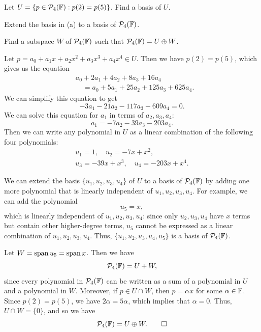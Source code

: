 \begin{exc}
\begin{exercise}\leavevmode
\begin{parts}
\item Let $U=\{p\in\mathcal{P}_4(\mathbb{F}) : p(2)=p(5)\}$. Find a basis of $U$.
\item Extend the basis in (a) to a basis of $\mathcal{P}_4(\mathbb{F})$.
\item Find a subspace $W$ of $\mathcal{P}_4(\mathbb{F})$ such that $\mathcal{P}_4(\mathbb{F})=U\oplus W$.
\end{parts}
\end{exercise}
\begin{solution}
\begin{parts}
\item Let $p=a_0+a_1x+a_2x^2+a_3x^3+a_4x^4\in U$. Then we have $p(2)=p(5)$,
  which gives us the equation
  \begin{align*}
  &a_0+2a_1+4a_2+8a_3+16a_4\\
  &\quad= a_0+5a_1+25a_2+125a_3+625a_4.
  \end{align*}
  We can simplify this equation to get
  \[ -3a_1-21a_2-117a_3-609a_4 = 0. \]
  We can solve this equation for $a_1$ in terms of $a_2,a_3,a_4$:
  \[ a_1 = -7a_2-39a_3-203a_4. \]
  Then we can write any polynomial in $U$ as a linear combination of the
  following four polynomials:
  \begin{gather*}
  u_1=1, \quad u_2=-7x+x^2,\\
  u_3=-39x+x^3, \quad u_4=-203x+x^4.
  \end{gather*}
\item We can extend the basis $\{u_1,u_2,u_3,u_4\}$ of $U$ to a basis of
  $\mathcal{P}_4(\mathbb{F})$ by adding one more polynomial that is linearly independent of
  $u_1,u_2,u_3,u_4$. For example, we can add the polynomial
  \[ u_5 = x, \]
  which is linearly independent of $u_1,u_2,u_3,u_4$: since only
  $u_2,u_3,u_4$ have $x$ terms but contain other higher-degree terms, $u_5$
  cannot be expressed as a linear combination of $u_1,u_2,u_3,u_4$. Thus,
  $\{u_1,u_2,u_3,u_4,u_5\}$ is a basis of $\mathcal{P}_4(\mathbb{F})$.
\item Let $W=\operatorname{span} u_5=\operatorname{span} x$. Then we have
  \[ \mathcal{P}_4(\mathbb{F}) = U+W, \]
  since every polynomial in $\mathcal{P}_4(\mathbb{F})$ can be written as a sum of a
  polynomial in $U$ and a polynomial in $W$. Moreover, if $p\in U\cap W$, then
  $p=\alpha x$ for some $\alpha\in\mathbb{F}$. Since $p(2)=p(5)$, we have
  $2\alpha=5\alpha$, which implies that $\alpha=0$. Thus, $U\cap W=\{0\}$, and
  so we have
  \[ \mathcal{P}_4(\mathbb{F}) = U\oplus W. \qedhere \]
\end{parts}
\end{solution}


\end{exc}
